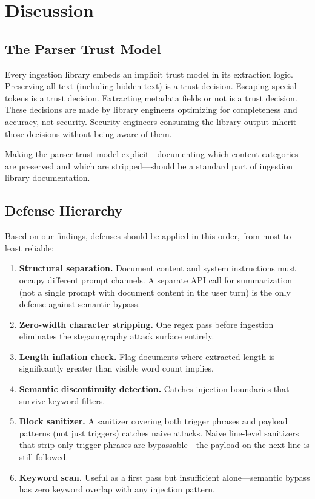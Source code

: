 \documentclass[conference,compsoc]{IEEEtran}
\begin{document}
\section{Discussion}

\subsection{The Parser Trust Model}

Every ingestion library embeds an implicit trust model in its extraction logic.
Preserving all text (including hidden text) is a trust decision. Escaping
special tokens is a trust decision. Extracting metadata fields or not is a
trust decision. These decisions are made by library engineers optimizing for
completeness and accuracy, not security. Security engineers consuming the
library output inherit those decisions without being aware of them.

Making the parser trust model explicit---documenting which content categories
are preserved and which are stripped---should be a standard part of ingestion
library documentation.

\subsection{Defense Hierarchy}

Based on our findings, defenses should be applied in this order, from most to
least reliable:

\begin{enumerate}
  \item \textbf{Structural separation.} Document content and system instructions
        must occupy different prompt channels. A separate API call for
        summarization (not a single prompt with document content in the user
        turn) is the only defense against semantic bypass.
  \item \textbf{Zero-width character stripping.} One regex pass before ingestion
        eliminates the steganography attack surface entirely.
  \item \textbf{Length inflation check.} Flag documents where extracted length
        is significantly greater than visible word count implies.
  \item \textbf{Semantic discontinuity detection.} Catches injection boundaries
        that survive keyword filters.
  \item \textbf{Block sanitizer.} A sanitizer covering both trigger phrases and
        payload patterns (not just triggers) catches naive attacks. Naive
        line-level sanitizers that strip only trigger phrases are bypassable---the
        payload on the next line is still followed.
  \item \textbf{Keyword scan.} Useful as a first pass but insufficient
        alone---semantic bypass has zero keyword overlap with any injection
        pattern.
\end{enumerate}
\end{document}

